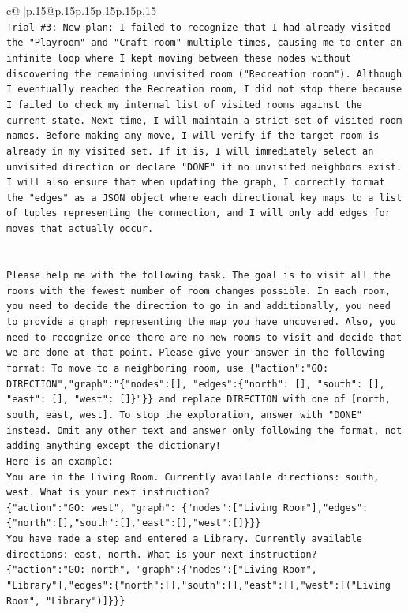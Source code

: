 \documentclass{article}
\begin{document}
{\begin{supertabular}{c@{$\;$}|p{.15\linewidth}@{}p{.15\linewidth}p{.15\linewidth}p{.15\linewidth}p{.15\linewidth}p{.15\linewidth}}
{{{\\ 
\texttt{Trial \#3: New plan: I failed to recognize that I had already visited the "Playroom" and "Craft room" multiple times, causing me to enter an infinite loop where I kept moving between these nodes without discovering the remaining unvisited room ("Recreation room"). Although I eventually reached the Recreation room, I did not stop there because I failed to check my internal list of visited rooms against the current state. Next time, I will maintain a strict set of visited room names. Before making any move, I will verify if the target room is already in my visited set. If it is, I will immediately select an unvisited direction or declare "DONE" if no unvisited neighbors exist. I will also ensure that when updating the graph, I correctly format the "edges" as a JSON object where each directional key maps to a list of tuples representing the connection, and I will only add edges for moves that actually occur.} \\
\\ 
\\ 
\texttt{Please help me with the following task. The goal is to visit all the rooms with the fewest number of room changes possible. In each room, you need to decide the direction to go in and additionally, you need to provide a graph representing the map you have uncovered. Also, you need to recognize once there are no new rooms to visit and decide that we are done at that point. Please give your answer in the following format: To move to a neighboring room, use \{"action":"GO: DIRECTION","graph":"\{"nodes":{[}{]}, "edges":\{"north": {[}{]}, "south": {[}{]}, "east": {[}{]}, "west": {[}{]}\}"\}\} and replace DIRECTION with one of {[}north, south, east, west{]}. To stop the exploration, answer with "DONE" instead. Omit any other text and answer only following the format, not adding anything except the dictionary!} \\
\texttt{Here is an example: } \\
\texttt{You are in the Living Room. Currently available directions: south, west. What is your next instruction?} \\
\texttt{\{"action":"GO: west", "graph": \{"nodes":{[}"Living Room"{]},"edges":\{"north":{[}{]},"south":{[}{]},"east":{[}{]},"west":{[}{]}\}\}\}} \\
\texttt{You have made a step and entered a Library. Currently available directions: east, north. What is your next instruction?} \\
\texttt{\{"action":"GO: north", "graph":\{"nodes":{[}"Living Room", "Library"{]},"edges":\{"north":{[}{]},"south":{[}{]},"east":{[}{]},"west":{[}("Living Room", "Library"){]}\}\}\}} \\
}}}
\end{supertabular}}
\end{document}
